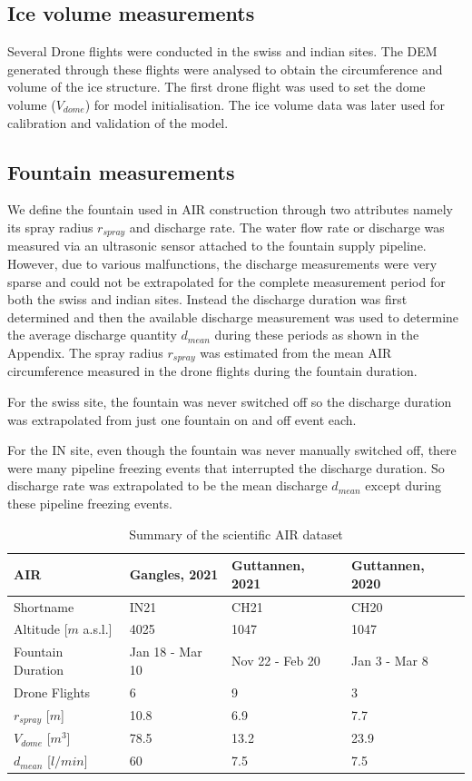 \documentclass[utf8]{frontiersSCNS} %
\begin{document}
\subsection{Ice volume measurements}
Several Drone flights were conducted in the swiss and indian sites. The DEM generated through these flights were
analysed to obtain the circumference and volume of the ice structure. The first drone flight was used to set the dome volume
($V_{dome}$) for model initialisation. The ice volume data was later used for calibration and validation of the model. 

\subsection{Fountain measurements} 
We define the fountain used in AIR construction through two attributes namely its spray radius $r_{spray}$ and discharge
rate. The water flow rate or discharge was measured via an ultrasonic sensor attached to the fountain supply pipeline.
However, due to various malfunctions, the discharge measurements were very sparse and could not be extrapolated for the
complete measurement period for both the swiss and indian sites. Instead the discharge duration was first determined and
then the available discharge measurement was used to determine the average discharge quantity $d_{mean}$ during these
periods as shown in the Appendix. The spray radius $r_{spray}$ was estimated from the mean AIR circumference measured in
the drone flights during the fountain duration.  

For the swiss site, the fountain was never switched off so the discharge duration was extrapolated from just one fountain
on and off event each.  

For the IN site, even though the fountain was never manually switched off, there were many pipeline freezing events that
interrupted the discharge duration. So discharge rate was extrapolated to be the mean discharge $d_{mean}$ except during
these pipeline freezing events.

\begin{table}[h]
\centering
\caption{ Summary of the scientific AIR dataset }
\label{tab:3AIR}
\begin{tabular}{@{}|l|l|l|l|@{}}
\toprule
\textbf{AIR}      & \textbf{Gangles, 2021} & \textbf{Guttannen, 2021} & \textbf{Guttannen, 2020} \\ \midrule
Shortname                      & IN21 & CH21 & CH20 \\ \midrule
Altitude {[}$m$ a.s.l.{]} & 4025 & 1047 & 1047 \\ \midrule
Fountain Duration & Jan 18 - Mar 10        & Nov 22 - Feb 20          & Jan 3 - Mar 8\\ \midrule
Drone Flights             & 6    & 9    & 3      \\ \midrule
$r_{spray}$ {[}$m${]}     & 10.8 & 6.9  & 7.7   \\ \midrule
$V_{dome}$ {[}$m^{3}${]}  & 78.5 & 13.2 & 23.9  \\ \midrule
$d_{mean}$ {[}$l/min${]}  & 60 & 7.5 & 7.5  \\ \bottomrule
\end{tabular}
\end{table}
\end{document}
